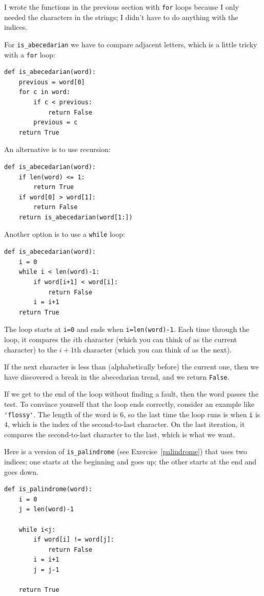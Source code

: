 \documentclass[10pt]{book}
\begin{document}
I wrote the functions in the previous section with {\tt for}
loops because I only needed the characters in the strings; I didn't
have to do anything with the indices.

For \verb"is_abecedarian" we have to compare adjacent letters,
which is a little tricky with a {\tt for} loop:

\begin{verbatim}
def is_abecedarian(word):
    previous = word[0]
    for c in word:
        if c < previous:
            return False
        previous = c
    return True
\end{verbatim}

An alternative is to use recursion:

\begin{verbatim}
def is_abecedarian(word):
    if len(word) <= 1:
        return True
    if word[0] > word[1]:
        return False
    return is_abecedarian(word[1:])
\end{verbatim}

Another option is to use a {\tt while} loop:

\begin{verbatim}
def is_abecedarian(word):
    i = 0
    while i < len(word)-1:
        if word[i+1] < word[i]:
            return False
        i = i+1
    return True
\end{verbatim}
%
The loop starts at {\tt i=0} and ends when {\tt i=len(word)-1}.  Each
time through the loop, it compares the $i$th character (which you can
think of as the current character) to the $i+1$th character (which you
can think of as the next).

If the next character is less than (alphabetically before) the current
one, then we have discovered a break in the abecedarian trend, and
we return {\tt False}.

If we get to the end of the loop without finding a fault, then the
word passes the test.  To convince yourself that the loop ends
correctly, consider an example like \verb"'flossy'".  The
length of the word is 6, so
the last time the loop runs is when {\tt i} is 4, which is the
index of the second-to-last character.  On the last iteration,
it compares the second-to-last character to the last, which is
what we want.

Here is a version of \verb"is_palindrome" (see
Exercise~\ref{palindrome}) that uses two indices; one starts at the
beginning and goes up; the other starts at the end and goes down.

\begin{verbatim}
def is_palindrome(word):
    i = 0
    j = len(word)-1

    while i<j:
        if word[i] != word[j]:
            return False
        i = i+1
        j = j-1

    return True
\end{verbatim}
\end{document}

